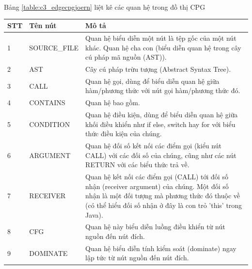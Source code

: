 Bảng \ref{table:c3_edgecpgjoern} liệt kê các quan hệ trong đồ thị CPG

\footnotesize
\begin{longtable}{| p{} | p{} | p{} |}
\hline
\textbf{STT} & \textbf{Tên nút} & \textbf{Mô tả} \\ \hline
1  & SOURCE\_FILE    & Quan hệ biểu diễn một nút là tệp gốc của một nút khác. Quan hệ cha con (biểu diễn quan hệ trong cây cú pháp mã nguồn (AST)).                                                                                 \\ \hline
2  & AST            & Cây cú pháp trừu tượng (Abstract Syntax Tree).                                                                                                                                                               \\ \hline
3  & CALL           & Quan hệ gọi, dùng để biểu diễn quan hệ giữa hàm/phương thức với nút gọi hàm/phương thức đó.                                                                                                                  \\ \hline
4  & CONTAINS       & Quan hệ bao gồm.                                                                                                                                                                                             \\ \hline
5  & CONDITION      & Quan hệ điều kiện, dùng để biểu diễn quan hệ giữa khối điều khiển như if else, switch hay for với biểu thức điều kiện của chúng.                                                                             \\ \hline
6  & ARGUMENT       & Quan hệ đối số kết nối các điểm gọi (kiểu nút CALL) với các đối số của chúng, cũng như các nút RETURN với các biểu thức trả về.                                                                              \\ \hline
7  & RECEIVER       & Quan hệ kết nối các điểm gọi (CALL) tới đối số nhận (receiver argument) của chúng. Một đối số nhận là một đối tượng mà phương thức đó thuộc về (có thể hiểu đối số nhận ở đây là con trỏ 'this' trong Java). \\ \hline
8  & CFG            & Quan hệ này biểu diễn luồng điều khiển từ nút nguồn đến nút đích.                                                                                                                                            \\ \hline
9  & DOMINATE       & Quan hệ biểu diễn tính kiểm soát (dominate) ngay lập tức từ nút nguồn đến nút đích.                                                                                                                          \\ \hline

\end{longtable}
